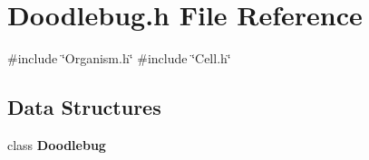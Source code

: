\section{Doodlebug.\+h File Reference}
\label{Doodlebug_8h}
{\ttfamily \#include \char`\"{}Organism.\+h\char`\"{}}\newline
{\ttfamily \#include \char`\"{}Cell.\+h\char`\"{}}\newline
\subsection*{Data Structures}
\begin{DoxyCompactItemize}
\item 
class \textbf{ Doodlebug}
\end{DoxyCompactItemize}
